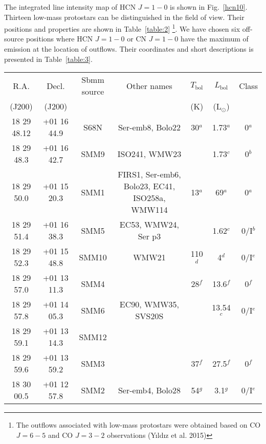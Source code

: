 \documentclass{aa}
\begin{document}
The integrated line intensity map of HCN $J=1-0$ is shown in Fig.~\ref{hcn10}. 
Thirteen low-mass protostars can be distinguished in the field of view. Their positions and properties are shown in Table~\ref{table:2} \footnote{The outflows associated with low-mass protostars were obtained based on CO $J=6-5$ and CO $J=3-2$ observations (Y{\i}ld{\i}z et al. 2015)}. We have chosen six off-source positions where HCN $J=1-0$ or CN $J=1-0$ have the maximum of emission at the location of outflows. Their coordinates and short descriptions is presented in Table~\ref{table:3}.

\begin{table*}
\caption{Catalogue of protostars properties}             %
\label{table:2}      %
\centering                          %
\begin{tabular}{c c c c c c c} 
\hline\hline 
R.A. & Decl. & Sbmm source & Other names & $T_\mathrm{bol}$ &  $L_\mathrm{bol}$  & Class\\
 (J200) & (J200) & & & (K) & (L$_\odot$) & \\
\hline  
18 29 48.12 & +01 16 44.9 & S68N  & Ser-emb8, Bolo22 & 30$^a$ & 1.73$^a$ & 0$^a$\\

18 29 48.3 & +01 16 42.7 & SMM9 & ISO241, WMW23& & 1.73$^c$ & 0$^b$\\

18 29 50.0 & +01 15 20.3 & SMM1 & FIRS1, Ser-emb6, Bolo23, EC41, ISO258a, WMW114 & 13$^a$ & 69$^a$ & 0$^a$\\

18 29 51.4 & +01 16 38.3 & SMM5 & EC53, WMW24, Ser p3 & & 1.62$^c$ & 0/I$^b$\\

18 29 52.3 & +01 15 48.8 & SMM10 & WMW21 & 110$^d$ & 4$^d$ & 0/I$^e$\\

18 29 57.0 & +01 13 11.3 & SMM4 & & 28$^f$ & 13.6$^f$ & 0$^f$\\

18 29 57.8 & +01 14 05.3 & SMM6 & EC90, WMW35, SVS20S & & 13.54$^c$ & 0/I$^e$\\

18 29 59.1 & +01 13 14.3 & SMM12 & & &  & \\

18 29 59.6 & +01 13 59.2 & SMM3 & & 37$^f$ & 27.5$^f$ & 0$^f$\\

18 30 00.5 & +01 12 57.8 & SMM2 & Ser-emb4, Bolo28 & 54$^g$ & 3.1$^g$ & 0/I$^e$\\


\end{tabular}
\end{table*}
\end{document}
